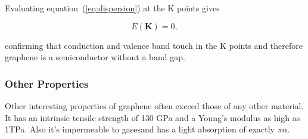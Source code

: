 Evaluating equation~(\ref{eq:dispersion}) at the K points gives

\begin{equation}
  E(\mathbf{K})=0,
\end{equation}

confirming that conduction and valence band touch in the K points and therefore graphene is a semiconductor without a band gap.

\subsubsection{Other Properties}

Other interesting properties of graphene often exceed those of any other material. It has an intrinsic tensile strength of 130 GPa and a Young's modulus as high as 1TPa\mcite. Also it's impermeable to gases\mcite and has a light absorption of exactly $\pi\alpha$\mcite.

